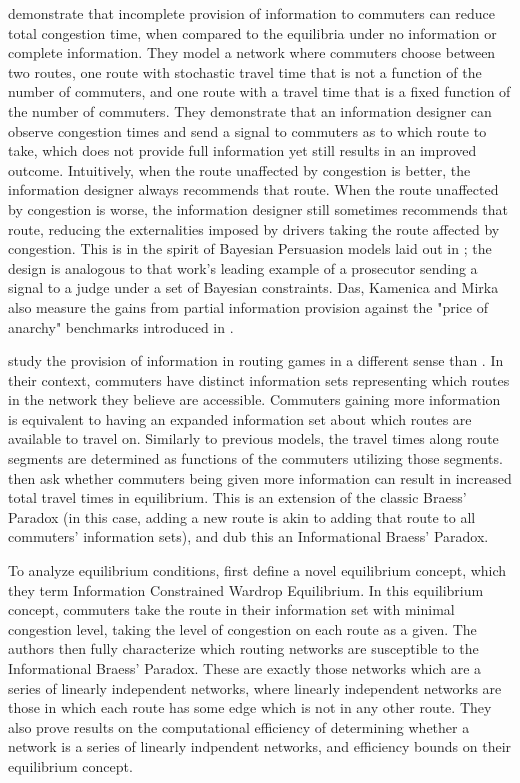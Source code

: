 \documentclass[JEL]{AEA}
\begin{document}

\cite{das-2017} demonstrate that incomplete provision of information to commuters can reduce total congestion time, when compared to the equilibria under no information or complete information. They model a network where commuters choose between two routes, one route with stochastic travel time that is not a function of the number of commuters, and one route with a travel time that is a fixed function of the number of commuters. They demonstrate that an information designer can observe congestion times and send a signal to commuters as to which route to take, which does not provide full information yet still results in an improved outcome. Intuitively, when the route unaffected by congestion is better, the information designer always recommends that route. When the route unaffected by congestion is worse, the information designer still sometimes recommends that route, reducing the externalities imposed by drivers taking the route affected by congestion. This is in the spirit of Bayesian Persuasion models laid out in \cite{kamenica-2011}; the design is analogous to that work's leading example of a prosecutor sending a signal to a judge under a set of Bayesian constraints. Das, Kamenica and Mirka also measure the gains from partial information provision against the "price of anarchy" benchmarks introduced in \cite{roughgarden-2002}.

\cite{acemoglu-2016} study the provision of information in routing games in a different sense than \cite{das-2017}. In their context, commuters have distinct information sets representing which routes in the network they believe are accessible. Commuters gaining more information is equivalent to having an expanded information set about which routes are available to travel on. Similarly to previous models, the travel times along route segments are determined as functions of the commuters utilizing those segments. \cite{acemoglu-2016} then ask whether commuters being given more information can result in increased total travel times in equilibrium. This is an extension of the classic Braess' Paradox (in this case, adding a new route is akin to adding that route to all commuters' information sets), and \cite{acemoglu-2016} dub this an Informational Braess' Paradox.

To analyze equilibrium conditions, \cite{acemoglu-2016} first define a novel equilibrium concept, which they term Information Constrained Wardrop Equilibrium. In this equilibrium concept, commuters take the route in their information set with minimal congestion level, taking the level of congestion on each route as a given. The authors then fully characterize which routing networks are susceptible to the Informational Braess' Paradox. These are exactly those networks which are a series of linearly independent networks, where linearly independent networks are those in which each route has some edge which is not in any other route. They also prove results on the computational efficiency of determining whether a network is a series of linearly indpendent networks, and efficiency bounds on their equilibrium concept.
\end{document}
